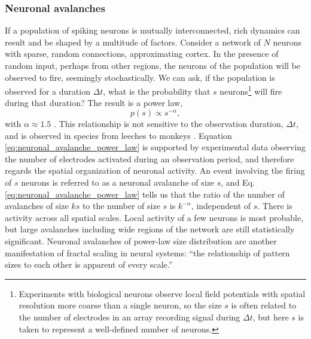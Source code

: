 \documentclass[twocolumn]{article}
\begin{document}
\subsubsection{Neuronal avalanches}
If a population of spiking neurons is mutually interconnected, rich dynamics can result and be shaped by a multitude of factors. Consider a network of $N$ neurons with sparse, random connections, approximating cortex. In the presence of random input, perhaps from other regions, the neurons of the population will be observed to fire, seemingly stochastically. We can ask, if the population is observed for a duration $\Delta t$, what is the probability that $s$ neurons\footnote{Experiments with biological neurons observe local field potentials with spatial resolution more coarse than a single neuron, so the size $s$ is often related to the number of electrodes in an array recording signal during $\Delta t$, but here $s$ is taken to represent a well-defined number of neurons.} will fire during that duration? The result is a power law,
\begin{equation}
\label{eq:neuronal_avalanche_power_law}
p(s) \propto s^{-\alpha},
\end{equation}
with $\alpha \approx 1.5$ \cite{plth2006,be2008}. This relationship is not sensitive to the observation duration, $\Delta t$, and is observed in species from leeches \cite{be2007} to monkeys \cite{peth2009}. Equation \ref{eq:neuronal_avalanche_power_law} is supported by experimental data observing the number of electrodes activated during an observation period, and therefore regards the spatial organization of neuronal activity. An event involving the firing of $s$ neurons is referred to as a neuronal avalanche \cite{bepl2003} of size $s$, and Eq.\,\ref{eq:neuronal_avalanche_power_law} tells us that the ratio of the number of avalanches of size $ks$ to the number of size $s$ is $k^{-\alpha}$, independent of $s$. There is activity across all spatial scales. Local activity of a few neurons is most probable, but large avalanches including wide regions of the network are still statistically significant. Neuronal avalanches of power-law size distribution are another manifestation of fractal scaling in neural systems: ``the relationship of pattern sizes to each other is apparent of every scale.'' \cite{plth2006} 
\end{document}
